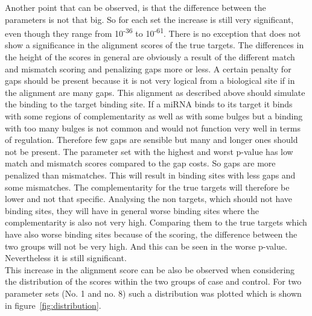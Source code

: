 \documentclass[12pt]{article}
\begin{document}
Another point that can be observed, is that the difference between the parameters is not that big. So for each set the increase is still very significant, even though they range from 10\textsuperscript{-36} to 10\textsuperscript{-61}. There is no exception that does not show a significance in the alignment scores of the true targets. The differences in the height of the scores in general are obviously a result of the different match and mismatch scoring and penalizing gaps more or less. A certain penalty for gaps should be present because it is not very logical from a biological site if in the alignment are many gaps. This alignment as described above should simulate the binding to the target binding site. If a miRNA binds to its target it binds with some regions of complementarity as well as with some bulges but a binding with too many bulges is not common and would not function very well in terms of regulation. Therefore few gaps are sensible but many and longer ones should not be present.
The parameter set with the highest and worst p-value has low match and mismatch scores compared to the gap costs. So gaps are more penalized than mismatches. This will result in binding sites with less gaps and some mismatches. The complementarity for the true targets will therefore be lower and not that specific. Analysing the non targets, which should not have binding sites, they will have in general worse binding sites where the complementarity is also not very high. Comparing them to the true targets which have also worse binding sites because of the scoring, the difference between the two groups will not be very high. And this can be seen in the worse p-value. Nevertheless it is still significant. \\

This increase in the alignment score can be also be observed when considering the distribution of the scores within the two groups of case and control. For two parameter sets (No. 1 and no. 8) such a distribution was plotted which is shown in figure~\ref{fig:distribution}. 
\end{document}
